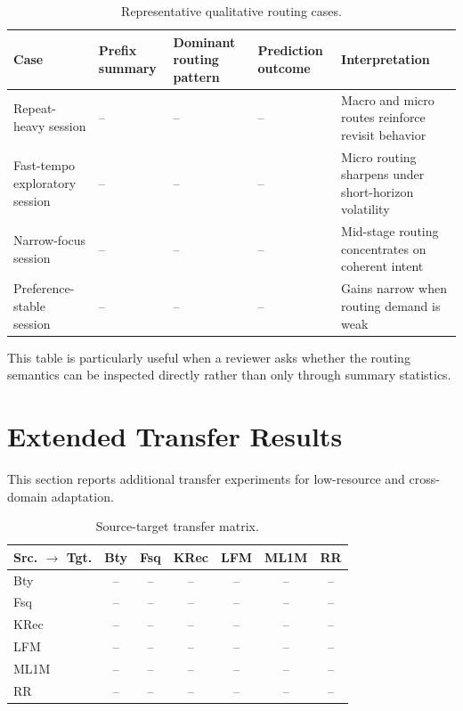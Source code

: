 \documentclass[sigconf,review,anonymous]{acmart}
\begin{document}
\begin{table}[t]
  \centering
  \caption{Representative qualitative routing cases.}
  \label{tab:appendix-qualitative-cases}
  \scriptsize
  \setlength{\tabcolsep}{4pt}
  \begin{tabularx}{\textwidth}{@{}lXlXl@{}}
    \toprule
    Case & Prefix summary & Dominant routing pattern & Prediction outcome & Interpretation \\
    \midrule
    Repeat-heavy session & -- & -- & -- & Macro and micro routes reinforce revisit behavior \\
    Fast-tempo exploratory session & -- & -- & -- & Micro routing sharpens under short-horizon volatility \\
    Narrow-focus session & -- & -- & -- & Mid-stage routing concentrates on coherent intent \\
    Preference-stable session & -- & -- & -- & Gains narrow when routing demand is weak \\
    \bottomrule
  \end{tabularx}
\end{table}

This table is particularly useful when a reviewer asks whether the routing semantics can be inspected directly rather than only through summary statistics.

\section{Extended Transfer Results}
\label{app:transfer}
This section reports additional transfer experiments for low-resource and cross-domain adaptation.

\begin{table}[t]
  \centering
  \caption{Source-target transfer matrix.}
  \label{tab:appendix-transfer-matrix}
  \scriptsize
  \setlength{\tabcolsep}{3pt}
  \begin{tabular*}{\columnwidth}{@{\extracolsep{\fill}}lcccccc@{}}
    \toprule
    Src. $\rightarrow$ Tgt. & Bty & Fsq & KRec & LFM & ML1M & RR \\
    \midrule
    Bty & -- & -- & -- & -- & -- & -- \\
    Fsq & -- & -- & -- & -- & -- & -- \\
    KRec & -- & -- & -- & -- & -- & -- \\
    LFM & -- & -- & -- & -- & -- & -- \\
    ML1M & -- & -- & -- & -- & -- & -- \\
    RR & -- & -- & -- & -- & -- & -- \\
    \bottomrule
  \end{tabular*}
\end{table}
\end{document}
